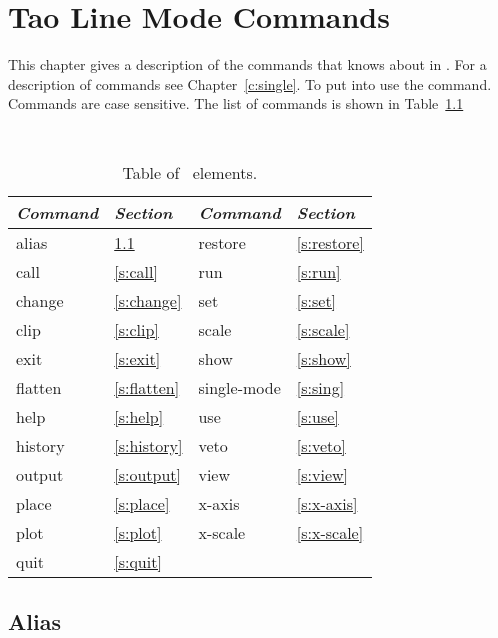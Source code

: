 \chapter{Tao Line Mode Commands}
\label{c:command}

This chapter gives a description of the commands that \tao knows about
in . For a description of  commands
see Chapter~\ref{c:single}. To put \tao into  use the
 command.
Commands are case sensitive. The list of commands 
is shown in Table~\ref{t:commands}

\begin{table}[h]
\centering
{\tt
\begin{tabular}{|l|l||l|l|} \hline
  {\it Command} & {\it Section}  & {\it Command} & {\it Section} \\ \hline
  alias    & \ref{s:alias}    &  restore     & \ref{s:restore} \\ \hline
  call     & \ref{s:call}     &  run         & \ref{s:run}     \\ \hline
  change   & \ref{s:change}   &  set         & \ref{s:set}     \\ \hline
  clip     & \ref{s:clip}     &  scale       & \ref{s:scale}   \\ \hline
  exit     & \ref{s:exit}     &  show        & \ref{s:show}    \\ \hline
  flatten  & \ref{s:flatten}  &  single-mode & \ref{s:sing}    \\ \hline
  help     & \ref{s:help}     &  use         & \ref{s:use}     \\ \hline
  history  & \ref{s:history}  &  veto        & \ref{s:veto}    \\ \hline
  output   & \ref{s:output}   &  view        & \ref{s:view}    \\ \hline
  place    & \ref{s:place}    &  x-axis      & \ref{s:x-axis}  \\ \hline
  plot     & \ref{s:plot}     &  x-scale     & \ref{s:x-scale} \\ \hline
  quit     & \ref{s:quit}     &              &                 \\ \hline
\end{tabular}
}
\caption{Table of \bmad\ elements.}
\label{t:commands}
\end{table}

\vfil
\break

\section{Alias}
\label{s:alias}

